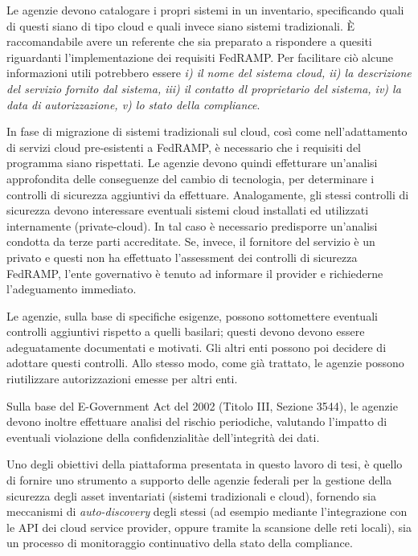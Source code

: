\documentclass[../main.tex]{subfiles}
\begin{document}
Le agenzie devono catalogare i propri sistemi in un inventario, specificando quali di questi siano di tipo cloud e quali invece siano sistemi tradizionali. È raccomandabile avere un referente che sia preparato a rispondere a quesiti riguardanti l'implementazione dei requisiti FedRAMP.
Per facilitare ciò alcune informazioni utili potrebbero essere \textit{i) il nome del sistema cloud, ii) la descrizione del servizio fornito dal sistema, iii) il contatto dl proprietario del sistema, iv) la data di autorizzazione, v) lo stato della compliance}.


In fase di migrazione di sistemi tradizionali sul cloud, così come nell'adattamento di servizi cloud pre-esistenti a FedRAMP, è necessario che i requisiti del programma siano rispettati. Le agenzie devono quindi effetturare un'analisi approfondita delle conseguenze del cambio di tecnologia, per determinare i controlli di sicurezza aggiuntivi da effettuare.
Analogamente, gli stessi controlli di sicurezza devono interessare eventuali sistemi cloud installati ed utilizzati internamente (private-cloud). In tal caso è necessario predisporre un'analisi condotta da terze parti accreditate.
Se, invece, il fornitore del servizio è un privato e questi non ha effettuato l'assessment dei controlli di sicurezza FedRAMP, l'ente governativo è tenuto ad informare il provider e richiederne l'adeguamento immediato. 

Le agenzie, sulla base di specifiche esigenze, possono sottomettere eventuali controlli aggiuntivi rispetto a quelli basilari; questi devono devono essere adeguatamente documentati e motivati. Gli altri enti possono poi decidere di adottare questi controlli.
Allo stesso modo, come già trattato, le agenzie possono riutilizzare autorizzazioni emesse per altri enti.

Sulla base del E-Government Act del 2002 (Titolo III, Sezione 3544), le agenzie devono inoltre effettuare analisi del rischio periodiche, valutando l'impatto di eventuali violazione della confidenzialitàe dell'integrità dei dati.

Uno degli obiettivi della piattaforma presentata in questo lavoro di tesi, è quello di fornire uno strumento a supporto delle agenzie federali per la gestione della sicurezza degli asset inventariati (sistemi tradizionali e cloud), fornendo sia meccanismi di \textit{auto-discovery} degli stessi (ad esempio mediante l'integrazione con le API dei cloud service provider, oppure tramite la scansione delle reti locali), sia un processo di monitoraggio continuativo della stato della compliance.
\end{document}
